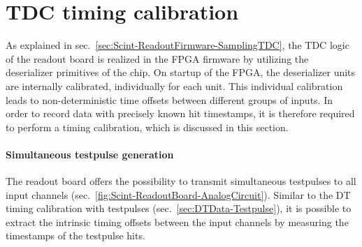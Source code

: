 \section{TDC timing calibration}
\label{sec:ScintData-TimingBias}
As explained in sec.\ \ref{sec:Scint-ReadoutFirmware-SamplingTDC}, the \ac{TDC} logic of the readout board is realized in the \ac{FPGA} firmware by utilizing the deserializer primitives of the chip. On startup of the \ac{FPGA}, the deserializer units are internally calibrated, individually for each unit. This individual calibration leads to non-deterministic time offsets between different groups of inputs. In order to record data with precisely known hit timestamps, it is therefore required to perform a timing calibration, which is discussed in this section.
\paragraph{Simultaneous testpulse generation}
The readout board offers the possibility to transmit simultaneous testpulses to all input channels (sec.\ \ref{fig:Scint-ReadoutBoard-AnalogCircuit}). Similar to the \ac{DT} timing calibration with testpulses (sec.\ \ref{sec:DTData-Testpulse}), it is possible to extract the intrinsic timing offsets between the input channels by measuring the timestamps of the testpulse hits.
